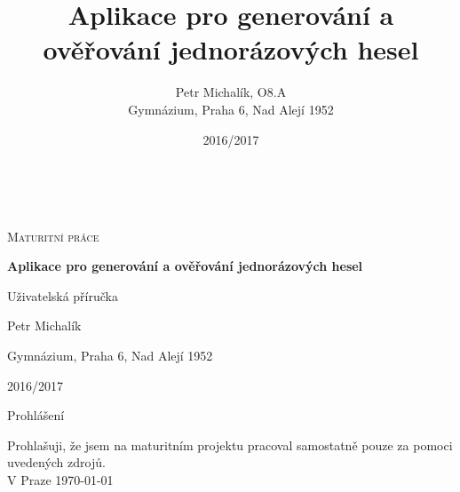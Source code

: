 \documentclass[12pt,opeany,a4paper,oneside]{book}
\author{Petr Michalík, O8.A\\Gymnázium, Praha 6, Nad Alejí 1952}
\title{Aplikace pro generování a ověřování jednorázových hesel}
\date{2016/2017}
\begin{document}
\begin{titlepage}
	\centering	
	{~\par}
	\vspace{4cm}
	{\scshape\LARGE  Maturitní práce  \par}
	\vspace{1cm}
	{\huge\bfseries Aplikace pro generování a ověřování jednorázových hesel \par}
	\vspace{1cm}
	{\large Uživatelská příručka \par}
	\vspace{4cm}
	
	\vfill
	
	{\large Petr Michalík \par}
	{\large Gymnázium, Praha 6, Nad Alejí 1952 \par}
	{\large 2016/2017\par}
\end{titlepage}

\pagestyle{plain}
\setcounter{page}{2}
\justify
{\normalfont\huge Prohlášení}
\vspace{2cm}

\raggedright
Prohlašuji, že jsem na maturitním projektu pracoval samostatně pouze za pomoci uvedených zdrojů.
\\
\vspace{5cm}
{V Praze \today}
\\
\clearpage
\shorthandoff{-}\shorthandon{-}
\end{document}
